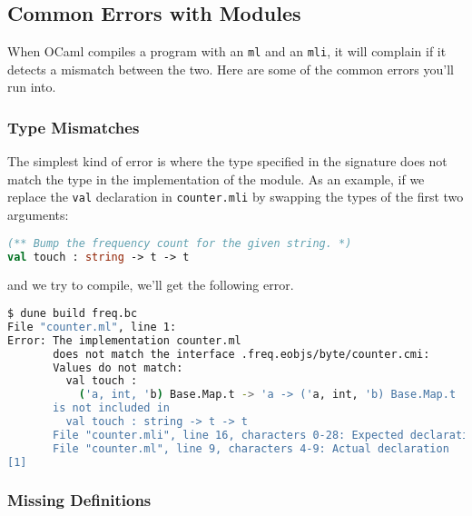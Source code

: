 \hypertarget{common-errors-with-modules}{%
\subsection{Common Errors with
Modules}\label{common-errors-with-modules}}

When OCaml compiles a program with an \passthrough{\lstinline!ml!} and
an \passthrough{\lstinline!mli!}, it will complain if it detects a
mismatch between the two. Here are some of the common errors you'll run
into.

\hypertarget{type-mismatches}{%
\subsubsection{Type Mismatches}\label{type-mismatches}}

The simplest kind of error is where the type specified in the signature
does not match the type in the implementation of the module. As an
example, if we replace the \passthrough{\lstinline!val!} declaration in
\passthrough{\lstinline!counter.mli!} by swapping the types of the first
two arguments: 

\begin{lstlisting}[language=Caml]
(** Bump the frequency count for the given string. *)
val touch : string -> t -> t
\end{lstlisting}

and we try to compile, we'll get the following error.

\begin{lstlisting}[language=bash]
$ dune build freq.bc
File "counter.ml", line 1:
Error: The implementation counter.ml
       does not match the interface .freq.eobjs/byte/counter.cmi:
       Values do not match:
         val touch :
           ('a, int, 'b) Base.Map.t -> 'a -> ('a, int, 'b) Base.Map.t
       is not included in
         val touch : string -> t -> t
       File "counter.mli", line 16, characters 0-28: Expected declaration
       File "counter.ml", line 9, characters 4-9: Actual declaration
[1]
\end{lstlisting}

\hypertarget{missing-definitions}{%
\subsubsection{Missing Definitions}\label{missing-definitions}}

